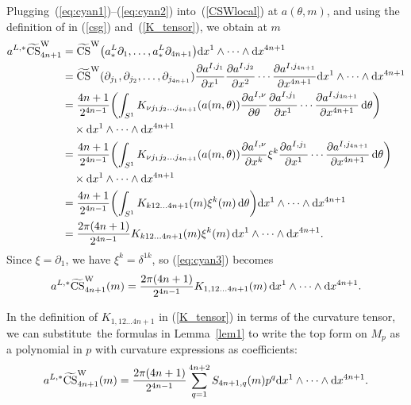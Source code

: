 \documentclass[10pt,a4paper]{amsart}
\numberwithin{equation}{section}
\theoremstyle{definition}
\newcommand{\ocs}{\widetilde{{\rm CS}}}
\newcommand{\omp}{M_p}
\begin{document}
Plugging~(\ref{eq:cyan1})--(\ref{eq:cyan2}) into~(\ref{CSWlocal}) at $a(\theta,m)$,
and using the definition of \smash{$\ocs^{\rm W}$} in (\ref{csg}) and~(\ref{K_tensor}), we obtain at $m$
\begin{align}
a^{L,*}\ocs^{\rm W}_{4n+1}
&= \ocs^{\rm W}\bigl(a^L_*\partial_1, \dots, a^L_*\partial_{4n+1}\bigr) {\rm d}x^1\wedge\cdots \wedge {\rm d}x^{4n+1}\nonumber\\
&= \ocs^{\rm W} (\partial_{j_1},\partial_{j_2},\dots,\partial_{j_{4n+1}} )
 \frac{\partial a^{I,j_1}}{\partial x^1} \frac{\partial a^{I,j_2}}{\partial x^2}\cdots
 \frac{\partial a^{I,j_{4n+1}}}{\partial x^{4n+1}}{\rm d}x^1\wedge\cdots \wedge {\rm d}x^{4n+1}\nonumber\\
 &= \frac{4n+1}{2^{4n-1}}\biggl(\int_{S^1} K_{\nu j_1 j_2 \dots j_{4n+1}}(a(m,\theta))
 \frac{\partial a^{I,\nu}}{\partial \theta}
 \frac{\partial a^{I,j_1}}{\partial x^1}\cdots
 \frac{\partial a^{I,j_{4n+1}}}{\partial x^{4n+1}}\, {\rm d}\theta\biggr)\nonumber\\
 &\quad \times {\rm d}x^1\wedge\cdots \wedge {\rm d}x^{4n+1}\nonumber\\
 &= \frac{4n+1}{2^{4n-1}}\biggl(\int_{S^1} K_{\nu j_1 j_2 \dots j_{4n+1}}(a(m,\theta))
 \frac{\partial a^{I,\nu}}{\partial x^k}\xi^k
 \frac{\partial a^{I,j_1}}{\partial x^1}\cdots
 \frac{\partial a^{I,j_{4n+1}}}{\partial x^{4n+1}}\, {\rm d}\theta\biggr)\nonumber\\
 &\quad \times {\rm d}x^1\wedge\cdots \wedge {\rm d}x^{4n+1}\nonumber\\
 &= \frac{4n+1}{2^{4n-1}}\biggl(\int_{S^1} K_{k 1 2\dots 4n+1}(m)\xi^k(m) \, {\rm d}\theta\biggr){\rm d}x^1\wedge\cdots \wedge {\rm d}x^{4n+1}\nonumber\\
 &= \frac{2\pi(4n+1)}{2^{4n-1}} K_{k 1 2\dots 4n+1}(m) \xi^k(m)\, {\rm d}x^1\wedge\cdots \wedge {\rm d}x^{4n+1}.\label{eq:cyan3}
\end{align}
Since $\xi = \partial_1$, we have $\xi^k = \delta^{1k}$, so (\ref{eq:cyan3}) becomes
\begin{equation}\label{eq:cyan4}
a^{L,*}\ocs^{\rm W}_{4n+1}(m) = \frac{2\pi(4n+1)}{2^{4n-1}} K_{1, 1 2\dots 4n+1}(m)\, {\rm d}x^1\wedge\cdots \wedge {\rm d}x^{4n+1}.
\end{equation}

In the definition of $K_{1,12\dots 4n+1}$ in (\ref{K_tensor}) in terms of the curvature tensor, we can substitute~the formulas in Lemma~\ref{lem1} to write the top form
\smash{$a^{L,*}\ocs{}^{\rm W}_{4n+1}$} on $\omp$ as a polynomial in $p$ with curvature expressions as coefficients:
\begin{equation}\label{eq:11aa}
a^{L,*}\ocs^{\rm W}_{4n+1}(m) = \frac{2\pi(4n+1)}{2^{4n-1}}\sum_{q = 1}^{4n+2} S_{4n+1,q}(m) p^q {\rm d}x^1\wedge\dots\wedge {\rm d}x^{4n+1}.
\end{equation}
\end{document}
